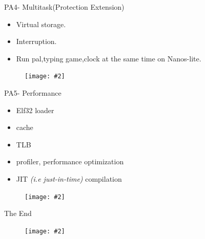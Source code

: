 \documentclass{beamer}
\newcommand{\fignocaption}[2]{
	\begin{figure}[htp]
		\centering
		\texttt{[image: \#2]}
	\end{figure}
}
\begin{document}
\begin{frame}{PA4- Multitask(Protection Extension)}
	\begin{itemize}
	\item Virtual storage.
	\item Interruption.
	\item Run pal,typing game,clock at the same time on Nanos-lite.
\end{itemize}
\fignocaption{scale=0.4}{am.png}
\end{frame}

\begin{frame}{PA5- Performance}
	\begin{itemize}
		\item Elf32 loader
		\item cache
		\item TLB
		\item profiler, performance optimization
		\item JIT \textit{(i.e just-in-time)} compilation
	\end{itemize}
\end{frame}

\begin{frame}
	\fignocaption{scale=0.4}{estimatedTime.png}
\end{frame}

\begin{frame}{The End}
	\fignocaption{scale=0.8}{studentFeedback.png}
\end{frame}
\end{document}
